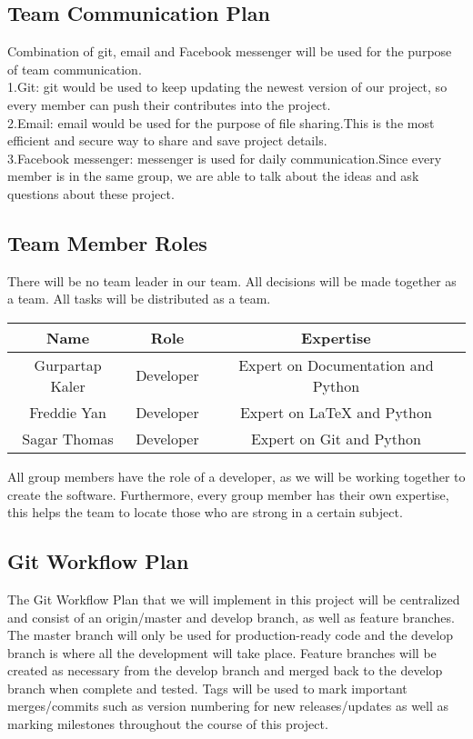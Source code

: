 \documentclass{article}
\begin{document}
\subsection{Team Communication Plan}
Combination of git, email and Facebook messenger will be used for the purpose of team communication.\\
1.Git: git would be used to keep updating the newest version of our project, so every member can push their contributes into the project. \\
2.Email: email would be used for the purpose of file sharing.This is the most efficient and secure way to share and save project details.\\
3.Facebook messenger: messenger is used for daily communication.Since every member is in the same group, we are able to talk about the ideas and ask questions about these project. 



\subsection{Team Member Roles}

There will be no team leader in our team. All decisions will be made together as a team. All tasks will be distributed as a team. \\

\begin{tabular}{|c|c|c|}
\hline
     Name & Role & Expertise \\
     \hline
     Gurpartap Kaler & Developer & Expert on Documentation and Python \\
     \hline
     Freddie Yan & Developer & Expert on LaTeX and Python \\
     \hline
     Sagar Thomas & Developer & Expert on Git and Python \\
     \hline
\end{tabular}

All group members have the role of a developer, as we will be working together to create the software. Furthermore, every group member has their own expertise, this helps the team to locate those who are strong in a certain subject.

\subsection{Git Workflow Plan}

The Git Workflow Plan that we will implement in this project will be centralized and consist of an origin/master and develop branch, as well as feature branches. The master branch will only be used for production-ready code and the develop branch is where all the development will take place. Feature branches will be created as necessary from the develop branch and merged back to the develop branch when complete and tested. Tags will be used to mark important merges/commits such as version numbering for new releases/updates as well as marking milestones throughout the course of this project.
\end{document}
